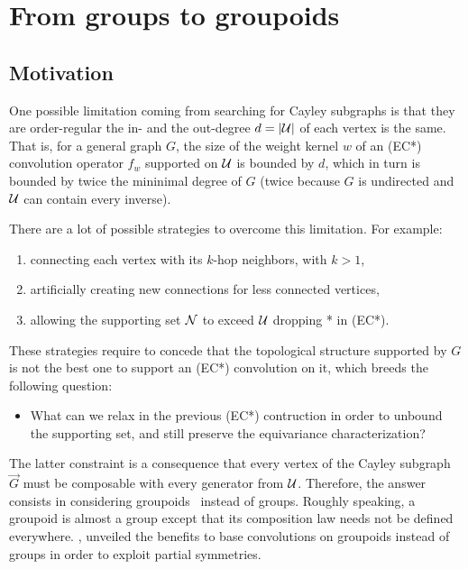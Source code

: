 \section{From groups to groupoids}

\subsection{Motivation}

One possible limitation coming from searching for Cayley subgraphs is that they are order-regular \ie the in- and the out-degree $d = |\mathcal{U}|$ of each vertex is the same. That is, for a general graph $G$, the size of the weight kernel $w$ of an (EC*) convolution operator $f_w$ supported on $\mathcal{U}$ is bounded by $d$, which in turn is bounded by twice the mininimal degree of $G$ (twice because $G$ is undirected and $\mathcal{U}$ can contain every inverse).

There are a lot of possible strategies to overcome this limitation. For example:
\begin{enumerate}
  \item connecting each vertex with its $k$-hop neighbors, with $k > 1$,
  \item artificially creating new connections for less connected vertices,
  \item allowing the supporting set $\mathcal{N}$ to exceed $\mathcal{U}$ \ie dropping * in (EC*).
\end{enumerate}

These strategies require to concede that the topological structure supported by $G$ is not the best one to support an (EC*) convolution on it, which breeds the following question:
\begin{itemize}
  \item What can we relax in the previous (EC*) contruction in order to unbound the supporting set, and still preserve the equivariance characterization?
\end{itemize}

The latter constraint is a consequence that every vertex of the Cayley subgraph $\vec{G}$ must be composable with every generator from $\mathcal{U}$. Therefore, the answer consists in considering groupoids~\citep{brandt1927verallgemeinerung} instead of groups. Roughly speaking, a groupoid is almost a group except that its composition law needs not be defined everywhere. \cite{weinstein1996groupoids}, unveiled the benefits to base convolutions on groupoids instead of groups in order to exploit partial symmetries.


